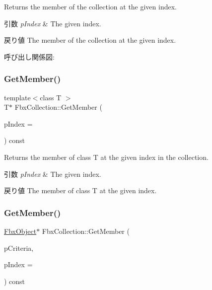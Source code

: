 Returns the member of the collection at the given index. 
\begin{DoxyParams}{引数}
{\em p\+Index} & The given index. \\
\hline
\end{DoxyParams}
\begin{DoxyReturn}{戻り値}
The member of the collection at the given index. 
\end{DoxyReturn}
呼び出し関係図\+:
\mbox{\label{class_fbx_collection_a36af3c2dc008c0c6261ff29b492eaee0}} 
\subsubsection{\texorpdfstring{Get\+Member()}{GetMember()}\hspace{0.1cm}{\footnotesize\ttfamily [2/3]}}
{\footnotesize\ttfamily template$<$class T $>$ \\
T$\ast$ Fbx\+Collection\+::\+Get\+Member (\begin{DoxyParamCaption}\item[{int}]{p\+Index = {} }\end{DoxyParamCaption}) const}

Returns the member of class T at the given index in the collection. 
\begin{DoxyParams}{引数}
{\em p\+Index} & The given index. \\
\hline
\end{DoxyParams}
\begin{DoxyReturn}{戻り値}
The member of class T at the given index. 
\end{DoxyReturn}
\mbox{\label{class_fbx_collection_a0734fa6462dbc0926b610dfc6047252e}} 
\subsubsection{\texorpdfstring{Get\+Member()}{GetMember()}\hspace{0.1cm}{\footnotesize\ttfamily [3/3]}}
{\footnotesize\ttfamily \hyperlink{class_fbx_object}{Fbx\+Object}$\ast$ Fbx\+Collection\+::\+Get\+Member (\begin{DoxyParamCaption}\item[{const \hyperlink{class_fbx_criteria}{Fbx\+Criteria} \&}]{p\+Criteria,  }\item[{int}]{p\+Index = {} }\end{DoxyParamCaption}) const}

